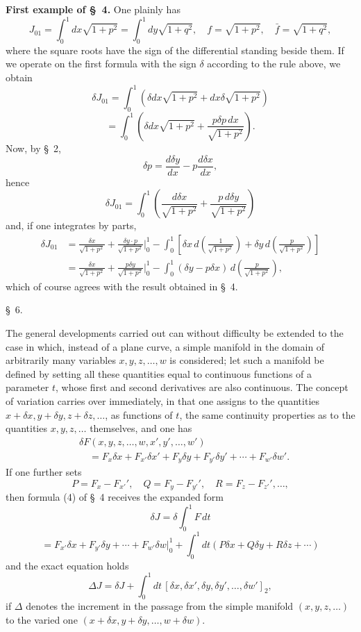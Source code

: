 \documentclass[11pt,a4paper,leqno]{article}
\begin{document}
\medskip
\noindent\textbf{First example of \S~4.} One plainly has
\[
J_{01}=\int_0^1dx\sqrt{1+p^2}=\int_0^1dy\sqrt{1+q^2},\quad f=\sqrt{1+p^2},\quad \bar f=\sqrt{1+q^2},
\]
where the square roots have the sign of the differential standing beside them. If we operate on the first formula with the sign \(\delta\) according to the rule above, we obtain
\[
\delta J_{01}=\int_0^1\left(\delta dx\sqrt{1+p^2}+dx\delta\sqrt{1+p^2}\right)
\]
\[
=\int_0^1\left(\delta dx\sqrt{1+p^2}+\frac{p\delta p\,dx}{\sqrt{1+p^2}}\right).
\]
Now, by \S~2,
\[
\delta p=\frac{d\delta y}{dx}-p\frac{d\delta x}{dx},
\]
hence
\[
\delta J_{01}=\int_0^1\left(\frac{d\delta x}{\sqrt{1+p^2}}+\frac{p\,d\delta y}{\sqrt{1+p^2}}\right)
\]
and, if one integrates by parts,
\[
\begin{aligned}
\delta J_{01}
&=\frac{\delta x}{\sqrt{1+p^2}}+\frac{\delta y\cdot p}{\sqrt{1+p^2}}\bigg|_0^1
-\int_0^1\left[\delta x\,d\left(\frac{1}{\sqrt{1+p^2}}\right)+\delta y\,d\left(\frac{p}{\sqrt{1+p^2}}\right)\right]\\
&=\frac{\delta x}{\sqrt{1+p^2}}+\frac{p\delta y}{\sqrt{1+p^2}}\bigg|_0^1
-\int_0^1(\delta y-p\delta x)\,d\left(\frac{p}{\sqrt{1+p^2}}\right),
\end{aligned}
\]
which of course agrees with the result obtained in \S~4.

\begin{center}
\S~6.
\end{center}

The general developments carried out can without difficulty be extended to the case in which, instead of a plane curve, a simple manifold in the domain of arbitrarily many variables \(x,y,z,\ldots,w\) is considered; let such a manifold be defined by setting all these quantities equal to continuous functions of a parameter \(t\), whose first and second derivatives are also continuous. The concept of variation carries over immediately, in that one assigns to the quantities \(x+\delta x,y+\delta y,z+\delta z,\ldots\), as functions of \(t\), the same continuity properties as to the quantities \(x,y,z,\ldots\) themselves, and one has
\[
\begin{aligned}
&\delta F(x,y,z,\ldots,w,x',y',\ldots,w')\\
&\quad=F_x\delta x+F_{x'}\delta x'+F_y\delta y+F_{y'}\delta y'+\cdots+F_{w'}\delta w'.
\end{aligned}
\]
If one further sets
\[
P=F_x-F_{x'}',\quad Q=F_y-F_{y'}',\quad R=F_z-F_{z'}',\ldots,
\]
then formula (4) of \S~4 receives the expanded form
\[
\delta J=\delta\int_0^1F\,dt
\]
\[
=F_{x'}\delta x+F_{y'}\delta y+\cdots+F_{w'}\delta w\bigg|_0^1+\int_0^1dt(P\delta x+Q\delta y+R\delta z+\cdots)
\]
and the exact equation holds
\[
\Delta J=\delta J+\int_0^1dt\,[\delta x,\delta x',\delta y,\delta y',\ldots,\delta w']_2,
\]
if \(\Delta\) denotes the increment in the passage from the simple manifold \((x,y,z,\ldots)\) to the varied one \((x+\delta x,y+\delta y,\ldots,w+\delta w)\).
\end{document}
